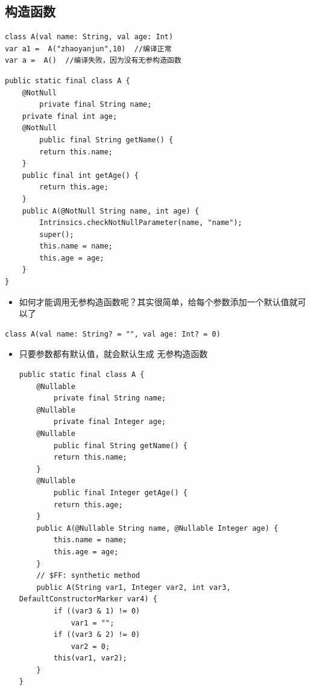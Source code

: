 \documentclass[9pt, b5paper]{article}
\begin{document}
\subsection{构造函数}
\label{sec-6-5}
\begin{verbatim}
class A(val name: String, val age: Int)
var a1 =  A("zhaoyanjun",10)  //编译正常
var a =  A()  //编译失败，因为没有无参构造函数
\end{verbatim}
\begin{verbatim}
public static final class A {
    @NotNull
        private final String name;
    private final int age;
    @NotNull
        public final String getName() {
        return this.name;
    }
    public final int getAge() {
        return this.age;
    }
    public A(@NotNull String name, int age) {
        Intrinsics.checkNotNullParameter(name, "name");
        super();
        this.name = name;
        this.age = age;
    }
}
\end{verbatim}
\begin{itemize}
\item 如何才能调用无参构造函数呢？其实很简单，给每个参数添加一个默认值就可以了
\end{itemize}
\begin{verbatim}
class A(val name: String? = "", val age: Int? = 0)
\end{verbatim}
\begin{itemize}
\item 只要参数都有默认值，就会默认生成 无参构造函数
\begin{verbatim}
public static final class A {
    @Nullable
        private final String name;
    @Nullable
        private final Integer age;
    @Nullable
        public final String getName() {
        return this.name;
    }
    @Nullable
        public final Integer getAge() {
        return this.age;
    }
    public A(@Nullable String name, @Nullable Integer age) {
        this.name = name;
        this.age = age;
    }
    // $FF: synthetic method
    public A(String var1, Integer var2, int var3, DefaultConstructorMarker var4) {
        if ((var3 & 1) != 0) 
            var1 = "";
        if ((var3 & 2) != 0) 
            var2 = 0;
        this(var1, var2);
    }
}
\end{verbatim}
\end{itemize}
\end{document}
